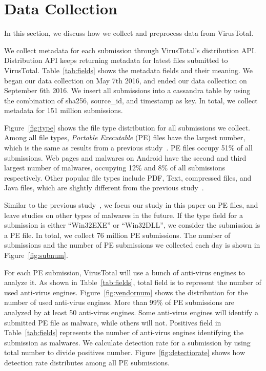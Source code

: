\section{Data Collection}
\label{sec:label}


In this section, we discuss how we collect and preprocess data from VirusTotal. 



We collect metadata for each submission through VirusTotal’s distribution API. 
Distribution API keeps returning metadata for latest files submitted to VirusTotal.
Table~\ref{tab:fields} shows the metadata fields and their meaning.  
We began our data collection on May 7th 2016, 
and ended our data collection on September 6th 2016. 
We insert all submissions into a cassandra table by using the combination of sha256, source\_id, and timestamp as key.
In total, we collect metadata for 151 million submissions. 

Figure~\ref{fig:type} shows the file type distribution for all submissions we collect. 
Among all file types, \textit{Portable Executable} (PE) files have the largest number, which is the same as results from a previous study~\cite{SongAPsys2016}.
PE files occupy 51\% of all submissions. 
Web pages and malwares on Android have the second and third largest number of malwares, 
occupying 12\% and 8\% of all submissions respectively. 
Other popular file types include PDF, Text, compressed files, and Java files, which are slightly different from the previous study~\cite{SongAPsys2016}. 

Similar to the previous study~\cite{SongAPsys2016}, we focus our study in this paper on PE files, 
and leave studies on other types of malwares in the future. 
If the type field for a submission is either ``Win32EXE'' or ``Win32DLL'', 
we consider the submission is a PE file. 
In total, we collect 76 million PE submissions. 
The number of submissions and the number of PE submissions we collected each day is shown in Figure~\ref{fig:subnum}. 





For each PE submission, VirusTotal will use a bunch of anti-virus engines to analyze it.
As shown in Table~\ref{tab:fields}, 
total field is to represent the number of used anti-virus engines. 
Figure~\ref{fig:vendornum} shows the distribution for the number of used anti-virus engines. 
More than 99\% of PE submissions are analyzed by at least 50 anti-virus engines. 
Some anti-virus engines will identify a submitted PE file as malware, while others will not. 
Positives field in Table~\ref{tab:fields} represents the number of anti-virus engines identifying the submission as malwares. 
We calculate detection rate for a submission by using total number to divide positives number. 
Figure~\ref{fig:detectiorate} shows how detection rate distributes among all PE submissions. 

